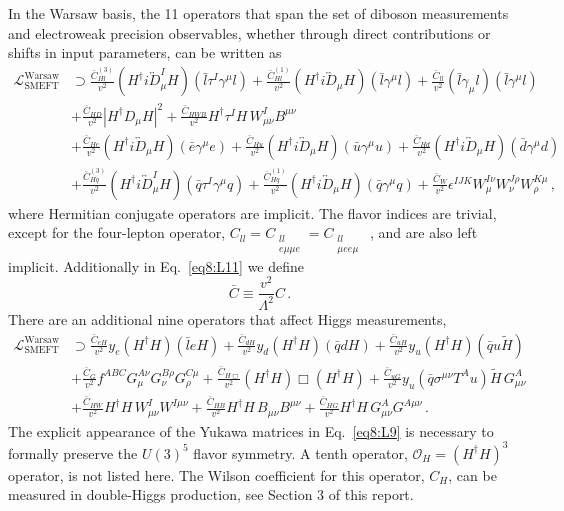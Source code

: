 \documentclass[../report.tex]{subfiles}
\begin{document}
In the Warsaw basis, the 11 operators that span the set of diboson measurements and electroweak precision observables, whether through direct contributions or shifts in input parameters, can be written as  
%
{\small
\begin{align}
\label{eq8:L11}
\mathcal{L}_\text{SMEFT}^\text{Warsaw} &\supset \frac{\bar{C}_{Hl}^{(3)}}{v^2} (H^\dag i\overleftrightarrow{D}^I_\mu H)(\bar l \tau^I \gamma^\mu l) + \frac{\bar{C}_{Hl}^{(1)}}{v^2}(H^\dag i\overleftrightarrow{D}_\mu H)(\bar l \gamma^\mu l) +\frac{\bar{C}_{ll}}{v^2}(\bar l \gamma_\mu l)(\bar l \gamma^\mu l) \nonumber \\
&+ \frac{\bar{C}_{HD}}{v^2}\left|H^\dag D_\mu H\right|^2 + \frac{\bar{C}_{HWB}}{v^2} H^\dag \tau^I H\, W^I_{\mu\nu} B^{\mu\nu}  \nonumber  \\ 
&+ \frac{\bar{C}_{He}}{v^2} (H^\dag i\overleftrightarrow{D}_\mu H)(\bar e \gamma^\mu e) \nonumber + \frac{\bar{C}_{Hu}}{v^2} (H^\dag i\overleftrightarrow{D}_\mu H)(\bar u \gamma^\mu u) + \frac{\bar{C}_{Hd}}{v^2} (H^\dag i\overleftrightarrow{D}_\mu H)(\bar d \gamma^\mu d) \nonumber \\
&+ \frac{\bar{C}_{Hq}^{(3)}}{v^2} (H^\dag i\overleftrightarrow{D}^I_\mu H)(\bar q \tau^I \gamma^\mu q) + \frac{\bar{C}_{Hq}^{(1)}}{v^2} (H^\dag i\overleftrightarrow{D}_\mu H)(\bar q \gamma^\mu q) + \frac{\bar{C}_{W}}{v^2} \epsilon^{IJK} W_\mu^{I\nu} W_\nu^{J\rho} W_\rho^{K\mu} \, ,
\end{align}
}
%
where Hermitian conjugate operators are implicit.
The flavor indices are trivial, except for the four-lepton operator, $C_{ll} = C_{\substack{ll \\ e\mu\mu e}} = C_{\substack{ll \\ \mu ee\mu}}$~\cite{Cirigliano:2009wk}, and are also left implicit.
Additionally in Eq.~\eqref{eq8:L11} we define
%
\begin{equation}
\bar{C} \equiv \frac{v^2}{\Lambda^2}C \, .
\end{equation}
%
There are an additional nine operators that affect Higgs measurements, 
%
{\small
\begin{align}
\label{eq8:L9}
\mathcal{L}_\text{SMEFT}^\text{Warsaw} &\supset  \frac{\bar{C}_{eH}}{v^2} y_e (H^\dag H)(\bar l e H) + \frac{\bar{C}_{dH}}{v^2} y_d (H^\dag H)(\bar q d H) + \frac{\bar{C}_{uH}}{v^2} y_u (H^\dag H)(\bar q u \widetilde H) \nonumber \\
&+ \frac{\bar{C}_{G}}{v^2} f^{ABC} G_\mu^{A\nu} G_\nu^{B\rho} G_\rho^{C\mu}  + \frac{\bar{C}_{H\Box}}{v^2} (H^\dag H)\Box(H^\dag H) + \frac{\bar{C}_{uG}}{v^2} y_u (\bar q \sigma^{\mu\nu} T^A u) \widetilde H \, G_{\mu\nu}^A   \nonumber \\
&+ \frac{\bar{C}_{HW}}{v^2} H^\dag H\, W^I_{\mu\nu} W^{I\mu\nu} + \frac{\bar{C}_{HB}}{v^2}H^\dag H\, B_{\mu\nu} B^{\mu\nu} + \frac{\bar{C}_{HG}}{v^2} H^\dag H\, G^A_{\mu\nu} G^{A\mu\nu} \, .
\end{align}}
The explicit appearance of the Yukawa matrices in Eq.~\eqref{eq8:L9} is necessary to formally preserve the $U(3)^5$ flavor symmetry.
A tenth operator, $\mathcal{O}_H = \left(H^{\dagger} H\right)^3$ operator, is not listed here.
The Wilson coefficient for this operator, $C_H$, can be measured in double-Higgs production, see Section 3 of this report.
\end{document}
